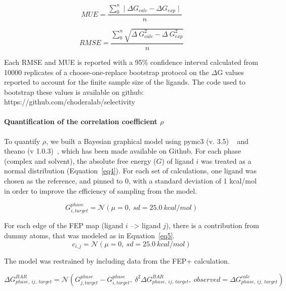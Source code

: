 \documentclass[9pt,lineno]{elife-modified} %
\begin{document}
\begin{equation}\label{eq2}
MUE = \frac{ \sum_{0}^{n} \mid \Delta G _{calc} - \Delta G _{exp} \mid}{n}
 \end{equation}
 
 \begin{equation}\label{eq3}
RMSE = \frac{ \sum_{0}^{n} \sqrt{\Delta~G_{calc}^2 - \Delta~G_{exp}^2}}{n} 
 \end{equation}
 
 Each RMSE and MUE is reported with a 95\% confidence interval calculated from 10000 replicates of a choose-one-replace bootstrap protocol on the $\Delta$G values reported to account for the finite sample size of the ligands. The code used to bootstrap these values is available on github: https://github.com/choderalab/selectivity
 
 \paragraph{Quantification of the correlation coefficient $\rho$}
 To quantify $\rho$, we built a Bayesian graphical model using pymc3 (v. 3.5) ~\citep{Salvatier:2016ki} and theano (v 1.0.3)~\citep{2016arXiv160502688full}, which has been made available on Github. For each phase (complex and solvent), the absolute free energy ($G$) of ligand $i$ was treated as a normal distribution (Equation~\ref{eq4}). For each set of calculations, one ligand was chosen as the reference, and pinned to 0, with a standard deviation of 1 kcal/mol in order to improve the efficiency of sampling from the model.
 
 \begin{equation}\label{eq4}
G^{phase}_{i,target} = \mathcal{N}(\mu=0,~sd=25.0~kcal/mol)
 \end{equation}
 
 For each edge of the FEP map (ligand $i$ --> ligand $j$), there is a contribution from dummy atoms, that was modeled as in Equation~\ref{eq5}.  
  \begin{equation}\label{eq5}
c_{i,j} = \mathcal{N}(\mu=0,~sd=25.0~kcal/mol)
 \end{equation}
 
 The model was restrained by including data from the FEP+ calculation. 
 
 \begin{equation}\label{eq6}
 \Delta G^{BAR}_{phase, ~ij, ~target} = \mathcal{N}(G^{phase}_{j, target} - G^{phase}_{i, target},~\delta^2\Delta G^{BAR}_{phase, ~ij, ~target}, ~observed = \Delta G^{calc}_{phase,~ij,~target})
 \end{equation}
 
\end{document}
